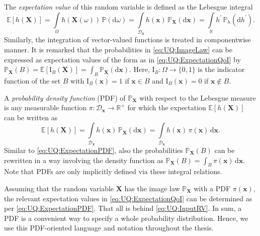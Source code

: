 The \emph{expectation value} of this random variable is defined as the Lebesgue integral
\begin{equation} \label{eq:UQ:ExpectationQoI}
  \mathds{E}[h(\bm{X})]
  = \int\limits_{\Omega} h(\bm{X}(\omega)) \, \mathds{P}(\mathrm{d} \omega)
  = \int\limits_{\mathcal{D}_{\bm{x}}} h(\bm{x}) \, \mathds{P}_{\bm{X}}(\mathrm{d} \bm{x})
  = \int\limits_{\mathds{R}} h^{\prime} \, \mathds{P}_{h}(\mathrm{d} h^{\prime}).
\end{equation}
Similarly, the integration of vector-valued functions is treated in componentwise manner.
It is remarked that the probabilities in \cref{eq:UQ:ImageLaw} can be expressed as expectation values of the form as in \cref{eq:UQ:ExpectationQoI} by
\(\mathds{P}_{\bm{X}}(B) = \mathds{E}[\mathrm{I}_B(\bm{X})] = \int_{B} \mathds{P}_{\bm{X}}(\mathrm{d} \bm{x})\).
Here, \(\mathrm{I}_B \colon \Omega \rightarrow \{0,1\}\) is the indicator function of the set \(B\) with
\(\mathrm{I}_B(\bm{x}) = 1\) if \(\bm{x} \in B\) and \(\mathrm{I}_B(\bm{x}) = 0\) if \(\bm{x} \notin B\).
\par %
A \emph{probability density function} (PDF) of \(\mathds{P}_{\bm{X}}\) with respect to the Lebesgue measure is any measurable function
\(\pi \colon \mathcal{D}_{\bm{x}} \rightarrow \mathds{R}^{+}\) for which the expectation \(\mathds{E}[h(\bm{X})]\) can be written as
\begin{equation} \label{eq:UQ:ExpectationPDF}
  \mathds{E}[h(\bm{X})]
  = \int\limits_{\mathcal{D}_{\bm{x}}} h(\bm{x}) \, \mathds{P}_{\bm{X}}(\mathrm{d} \bm{x})
  = \int\limits_{\mathcal{D}_{\bm{x}}} h(\bm{x}) \, \pi(\bm{x}) \, \mathrm{d} \bm{x}.
\end{equation}
Similar to \cref{eq:UQ:ExpectationPDF}, also the probabilities \(\mathds{P}_{\bm{X}}(B)\) can be rewritten
in a way involving the density function as \(\mathds{P}_{\bm{X}}(B) = \int_{B} \pi(\bm{x}) \, \mathrm{d} \bm{x}\).
Note that PDFs are only implicitly defined via these integral relations.
\par %
Assuming that the random variable \(\bm{X}\) has the image law \(\mathds{P}_{\bm{X}}\) with a PDF \(\pi(\bm{x})\),
the relevant expectation values in \cref{eq:UQ:ExpectationQoI} can be determined as per \cref{eq:UQ:ExpectationPDF}.
That all is behind \cref{eq:UQ:InputRV}.
In sum, a PDF is a convenient way to specify a whole probability distribution.
Hence, we use this PDF-oriented language and notation throughout the thesis.

